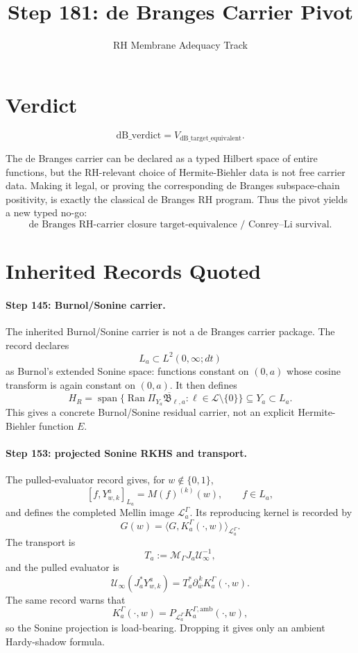 \documentclass[11pt]{article}
\title{Step 181: de Branges Carrier Pivot}
\author{RH Membrane Adequacy Track}
\date{}
\newcommand{\dB}{\mathrm{dB}}
\begin{document}
\maketitle

\section*{Verdict}

\[
\boxed{\mathrm{dB\_verdict}=V_{\dB\_\mathrm{target\_equivalent}}.}
\]

The de Branges carrier can be declared as a typed Hilbert space of entire
functions, but the RH-relevant choice of Hermite-Biehler data is not free
carrier data.  Making it legal, or proving the corresponding de Branges
subspace-chain positivity, is exactly the classical de Branges RH program.
Thus the pivot yields a new typed no-go:
\[
\boxed{\text{de Branges RH-carrier closure target-equivalence / Conrey--Li survival}.}
\]

\section*{Inherited Records Quoted}

\paragraph{Step 145: Burnol/Sonine carrier.}
The inherited Burnol/Sonine carrier is not a de Branges carrier package.  The
record declares
\[
L_a\subset L^2(0,\infty;dt)
\]
as Burnol's extended Sonine space: functions constant on \((0,a)\) whose
cosine transform is again constant on \((0,a)\).  It then defines
\[
H_R=\overline{\operatorname{span}\{
\operatorname{Ran}\Pi_{Y_a}\mathfrak B_{\ell,a}:
\ell\in\mathcal L\setminus\{0\}\}}\subseteq Y_a\subset L_a.
\]
This gives a concrete Burnol/Sonine residual carrier, not an explicit
Hermite-Biehler function \(E\).

\paragraph{Step 153: projected Sonine RKHS and transport.}
The pulled-evaluator record gives, for \(w\notin\{0,1\}\),
\[
[f,Y^a_{w,k}]_{L_a}=M(f)^{(k)}(w), \qquad f\in L_a,
\]
and defines the completed Mellin image \(\mathcal L_a^\Gamma\).  Its
reproducing kernel is recorded by
\[
G(w)=\langle G,K_a^\Gamma(\cdot,w)\rangle_{\mathcal L_a^\Gamma}.
\]
The transport is
\[
T_a:=\mathcal M_\Gamma J_a\mathcal U_\infty^{-1},
\]
and the pulled evaluator is
\[
\mathcal U_\infty(J_a^*Y^a_{w,k})
   =T_a^*\partial_{\overline w}^{\,k}K_a^\Gamma(\cdot,w).
\]
The same record warns that
\[
K_a^\Gamma(\cdot,w)=P_{\mathcal L_a^\Gamma}
K_a^{\Gamma,\mathrm{amb}}(\cdot,w),
\]
so the Sonine projection is load-bearing.  Dropping it gives only an ambient
Hardy-shadow formula.
\end{document}
